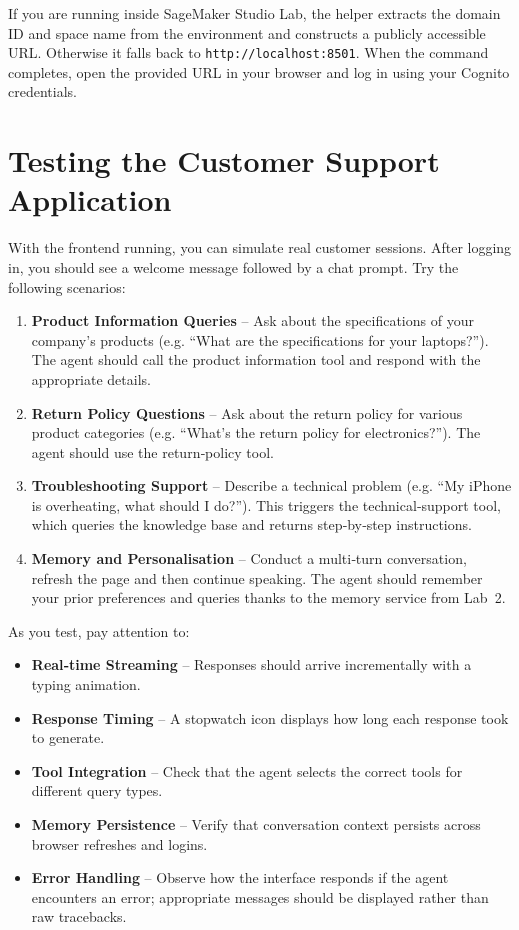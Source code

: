 If you are running inside SageMaker Studio Lab, the helper extracts the
domain ID and space name from the environment and constructs a
publicly accessible URL.  Otherwise it falls back to
\texttt{http://localhost:8501}.  When the command completes, open
the provided URL in your browser and log in using your Cognito
credentials.

\section{Testing the Customer Support Application}

With the frontend running, you can simulate real customer sessions.
After logging in, you should see a welcome message followed by a chat
prompt.  Try the following scenarios:

\begin{enumerate}
  \item \textbf{Product Information Queries} – Ask about the
    specifications of your company’s products (e.g. “What are the
    specifications for your laptops?”).  The agent should call the
    product information tool and respond with the appropriate details.

  \item \textbf{Return Policy Questions} – Ask about the return policy
    for various product categories (e.g. “What’s the return policy for
    electronics?”).  The agent should use the return‑policy tool.

  \item \textbf{Troubleshooting Support} – Describe a technical
    problem (e.g. “My iPhone is overheating, what should I do?”).  This
    triggers the technical‑support tool, which queries the knowledge
    base and returns step‑by‑step instructions.

  \item \textbf{Memory and Personalisation} – Conduct a multi‑turn
    conversation, refresh the page and then continue speaking.  The
    agent should remember your prior preferences and queries thanks to
    the memory service from Lab 2.
\end{enumerate}

As you test, pay attention to:

\begin{itemize}
  \item \textbf{Real‑time Streaming} – Responses should arrive
        incrementally with a typing animation.
  \item \textbf{Response Timing} – A stopwatch icon displays how long
        each response took to generate.
  \item \textbf{Tool Integration} – Check that the agent selects the
        correct tools for different query types.
  \item \textbf{Memory Persistence} – Verify that conversation
        context persists across browser refreshes and logins.
  \item \textbf{Error Handling} – Observe how the interface responds
        if the agent encounters an error; appropriate messages should
        be displayed rather than raw tracebacks.
\end{itemize}

